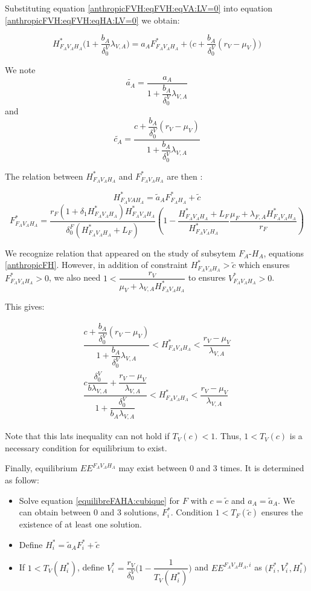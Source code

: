 \documentclass{article}
\newcommand{\lfa}{\lambda_{F, A}}
\newcommand{\lva}{\lambda_{V, A}}
\newcommand{\df}{\delta_0^F}
\newcommand{\dv}{\delta_0^V}
\begin{document}
Substituting equation \eqref{anthropicFVH:eqFVH:eqVA:LV=0} into equation \eqref{anthropicFVH:eqFVH:eqHA:LV=0} we obtain:

\begin{equation*}
H^*_{F_AV_AH_A} \Big(1 + \dfrac{b_A}{\dv}\lva \Big) = a_A F^*_{F_AV_AH_A} + \Big(c +\dfrac{b_A}{\dv} (r_V - \mu_V) \Big)
\end{equation*}

We note
$$ \tilde{a_A} = \dfrac{a_A}{1 + \dfrac{b_A}{\dv}\lva}$$ and 
$$ \tilde{c_A} = \dfrac{c +\dfrac{b_A}{\dv} (r_V - \mu_V)}{1 + \dfrac{b_A}{\dv}\lva}$$

The relation between $H^*_{F_AV_AH_A}$ and $F^*_{F_AV_AH_A}$ are then :

\begin{equation}
H^*_{F_AVAH_A} = \tilde{a}_A F^*_{F_AH_A} + \tilde{c}
\label{anthropicFVH:eqFVH:eqHA:LV=0:v2}
\end{equation}
\begin{equation}
F^*_{F_AV_AH_A} = \dfrac{r_F(1+\delta_1 H^*_{F_AV_AH_A})H^*_{F_AV_AH_A}}{\df(H^*_{F_AV_AH_A} + L_F)} \left(1 - \dfrac{H^*_{F_AV_AH_A} + L_F}{H^*_{F_AV_AH_A}}\dfrac{\mu_F + \lfa H^*_{F_AV_AH_A}}{r_F} \right)
\label{anthropicFVH:eqFVH:eqFA:LV=0:v2}
\end{equation}

We recognize relation that appeared on the study of subsytem $F_A$-$H_A$, equations \eqref{anthropicFH}. However, in addition of constraint $H^*_{F_AV_AH_A} > \tilde{c}$ which ensures $F^*_{F_AV_AH_A} > 0$, we also need $1 < \dfrac{r_V}{\mu_V + \lva H^*_{F_AV_AH_A}}$ to ensures $V^*_{F_AV_AH_A} > 0$.

This gives:

\begin{align*}
\dfrac{c +\dfrac{b_A}{\dv} (r_V - \mu_V)}{1 + \dfrac{b_A}{\dv}\lva} < H^*_{F_AV_AH_A} < \dfrac{r_V - \mu_V}{\lva} \\
\dfrac{c \dfrac{\dv}{b \lva} +\dfrac{r_V - \mu_V}{\lva}}{1 + \dfrac{\dv}{b_A \lva}} < H^*_{F_AV_AH_A} < \dfrac{r_V - \mu_V}{\lva}
\end{align*}


Note that this lats inequality can not hold if $T_V(c) < 1$. Thus, $1 < T_V(c)$ is a necessary condition for equilibrium to exist.


Finally, equilibrium $EE^{F_AV_AH_A}$ may exist between 0 and 3 times. It is determined as follow:
\begin{itemize}
\item Solve equation \eqref{equilibreFAHA:cubique} for $F$ with $c = \tilde{c}$ and $a_A = \tilde{a}_A$. We can obtain between 0 and 3 solutions, $F^*_i$. Condition $1 < T_F(\tilde{c})$ ensures the existence of at least one solution.
\item Define $H^*_i =  \tilde{a}_A F^*_i + \tilde{c}$
\item If $1 < T_V(H^*_i)$, define $V^*_i = \dfrac{r_V}{\dv}\Big(1 - \dfrac{1}{T_V(H^*_i)} \Big) $ and $EE^{F_AV_AH_A, i}$ as $\Big(F^*_i, V^*_i, H^*_i \Big)$
\end{itemize}
\end{document}

